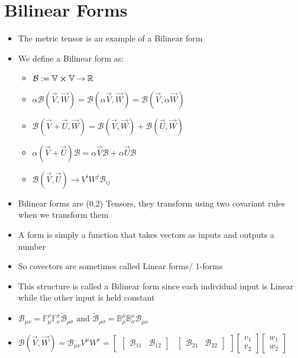 \section{Bilinear Forms}
\begin{itemize}
	\item The metric tensor is an example of a Bilinear form
	\item We define a Bilinear form as:
	\begin{itemize}
		\item $\mathcal{B} : = \mathbb{V} \cross \mathbb{V} \rightarrow \mathbb{R}$
		\item $\alpha \mathcal{B}(\vec{V}, \vec{W}) = \mathcal{B}(\alpha\vec{V}, \vec{W}) =  \mathcal{B}(\vec{V}, \alpha\vec{W})$
		\item $\mathcal{B}(\vec{V} + \vec{U}, \vec{W}) = \mathcal{B}(\vec{V}, \vec{W}) + \mathcal{B}(\vec{U}, \vec{W})$
		\item $\alpha(\vec{V} + \vec{U})\mathcal{B} = \alpha\vec{V}\mathcal{B} + \alpha\vec{U}\mathcal{B}$
		\item $\mathcal{B}(\vec{V}, \vec{U}) \rightarrow V^{i}W^{j}\mathcal{B}_{ij}$
	\end{itemize}
	\item Bilinear forms are (0,2) Tensors, they transform using two covariant rules when we transform them
	\item A form is simply a function that takes vectors as inputs and outputs a number
	\item So covectors are sometimes called Linear forms/ 1-forms
	\item This structure is called a Bilinear form since each individual input is Linear while the other input is held constant
	\item $\mathcal{B}_{\mu \nu} = \mathbb{F}^{\rho}_{\mu} \mathbb{F}^{\sigma}_{\nu}\tilde{\mathcal{B}}_{\rho \sigma}$ and $\tilde{\mathcal{B}}_{\rho \sigma} = \mathbb{B}^{\mu}_{\rho} \mathbb{B}^{\nu}_{\sigma}\mathcal{B}_{\mu \nu}$
	\item $\mathcal{B}(\vec{V}, \vec{W}) = \mathcal{B}_{\mu \nu}V^{\mu}W^{\nu} = \begin{bmatrix}
	\begin{bmatrix}
	\mathcal{B}_{11} & \mathcal{B}_{12}
	\end{bmatrix} & \begin{bmatrix}
	\mathcal{B}_{21} & \mathcal{B}_{22}
	\end{bmatrix}
	\end{bmatrix} \begin{bmatrix}
	v_{1}\\
	v_{2}
	\end{bmatrix} \begin{bmatrix}
	w_{1}\\
	w_{2}
	\end{bmatrix}$
\end{itemize}


